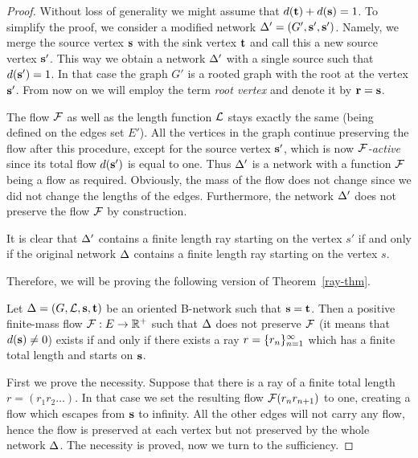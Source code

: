 \documentclass[12pt,oneside,a4paper]{amsart}
\begin{document}
    \begin{proof}
      Without loss of generality we might assume that $d(\mathbf{t}) + d(\mathbf{s}) = 1$.
      To simplify the proof, we consider a modified network $\Delta' = (G', \mathbf{s}', \mathbf{s}')$.
      Namely, we merge the source vertex $\mathbf{s}$ with the sink vertex $\mathbf{t}$ and call this a new source vertex $\mathbf{s}'$.
      This way we obtain a network $\Delta'$ with a single source such that $d(\mathbf{s}') = 1$.
      In that case the graph $G'$ is a rooted graph with the root at the vertex $\mathbf{s}'$.
      From now on we will employ the term \emph{root vertex} and denote it by $\mathbf{r} = \mathbf{s}$.

      The flow $\mathcal{F}$ as well as the length function $\mathcal{L}$ stays exactly the same (being defined on the edges set $E'$).
      All the vertices in the graph continue preserving the flow after this procedure, except for the source vertex $\mathbf{s}'$,
        which is now \emph{$\mathcal{F}$-active} since its total flow $d(\mathbf{s}')$ is equal to one.
      Thus $\Delta'$ is a network with a function $\mathcal{F}$ being a flow as required.
      Obviously, the mass of the flow does not change since we did not change the lengths of the edges.
      Furthermore, the network $\Delta'$ does not preserve the flow $\mathcal{F}$ by construction.

      It is clear that $\Delta'$ contains a finite length ray starting on the vertex $s'$ if and only if the original network $\Delta$ contains a finite
        length ray starting on the vertex $s$.

      Therefore, we will be proving the following version of Theorem~\ref{ray-thm}.
      \begin{theorem*}
        Let $\Delta = (G, \mathcal{L}, \mathbf{s}, \mathbf{t})$ be an oriented B-network such that $\mathbf{s} = \mathbf{t}$.
        Then a positive finite-mass flow $\mathcal{F}: E \to \mathbb{R}^{+}$ such that
          $\Delta$ does not preserve $\mathcal{F}$ (it means that $d(\mathbf{s}) \neq 0$)
          exists if and only if there exists a ray $r = \{{r}_n\}_{n=1}^\infty$ which has a finite total length and starts on $\mathbf{s}$.
      \end{theorem*}
      First we prove the necessity.
      Suppose that there is a ray of a finite total length $r=(r_1 r_2 \dots)$.
      In that case we set the resulting flow $\mathcal{F}(r_n r_{n+1})$ to one, creating a flow which escapes
        from $\mathbf{s}$ to infinity.
      All the other edges will not carry any flow, hence the flow is preserved
        at each vertex but not preserved by the whole network $\Delta$.
      The necessity is proved, now we turn to the sufficiency.


\end{proof}
\end{document}
